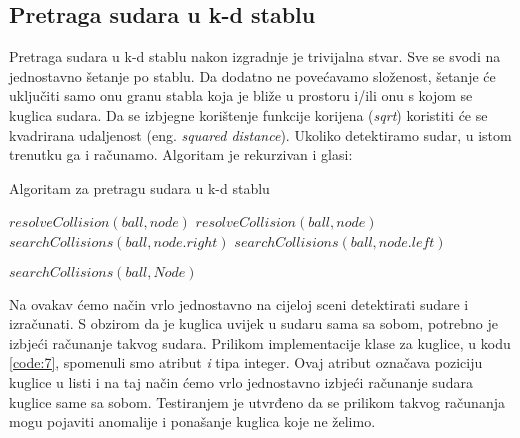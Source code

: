 \subsection{Pretraga sudara u k-d stablu}
Pretraga sudara u k-d stablu nakon izgradnje je trivijalna stvar. Sve se svodi na jednostavno šetanje po stablu. Da dodatno ne povećavamo složenost, šetanje će uključiti samo onu granu stabla koja je bliže u prostoru i/ili onu s kojom se kuglica sudara. Da se izbjegne korištenje funkcije korijena (\emph{sqrt}) koristiti će se kvadrirana udaljenost (eng. \emph{squared distance}). Ukoliko detektiramo sudar, u istom trenutku ga i računamo. Algoritam je rekurzivan i glasi:\newpage
\begin{algorithm}
	\caption{Algoritam za pretragu sudara u k-d stablu}
	\label{alg:serch_collisions_kd}
	\begin{algorithmic}	
		\State $resolveCollision(ball,node)$
		\EndIf
		\Return
		\EndIf
			$resolveCollision(ball,node)$
		\EndIf
		\State $searchCollisions(ball, node.right)$
		\State $searchCollisions(ball, node.left)$
		\EndIf
		\EndFunction
		
		\State $searchCollisions(ball,Node)$
		\EndFor
		\EndFunction

	\end{algorithmic}
\end{algorithm}
Na ovakav ćemo način vrlo jednostavno na cijeloj sceni detektirati sudare i izračunati. S obzirom da je kuglica uvijek u sudaru sama sa sobom, potrebno je izbjeći računanje takvog sudara. Prilikom implementacije klase za kuglice, u kodu \ref{code:7}, spomenuli smo atribut \emph{i} tipa integer. Ovaj atribut označava poziciju kuglice u listi i na taj način ćemo vrlo jednostavno izbjeći računanje sudara kuglice same sa sobom. Testiranjem je utvrđeno da se prilikom takvog računanja mogu pojaviti anomalije i ponašanje kuglica koje ne želimo.\newpage
